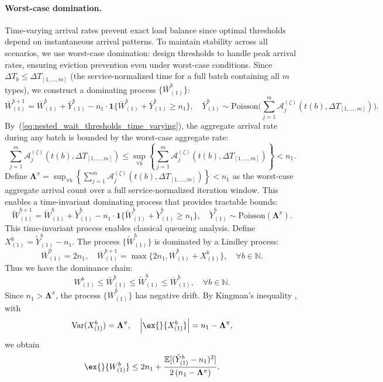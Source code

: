 \paragraph{Worst-case domination.} Time-varying arrival rates prevent exact load balance since optimal thresholds depend on instantaneous arrival patterns. To maintain stability across all scenarios, we use worst-case domination: design thresholds to handle peak arrival rates, ensuring eviction prevention even under worst-case conditions. Since $\Delta T_b\leq \Delta T_{[1,\dots,m]}$ (the service-normalized time for a full batch containing all $m$ types), we construct a dominating process $\{\bar{W}_{(1)}^{b}\}$:
$$ \bar{W}_{(1)}^{b+1} = \bar{W}_{(1)}^{b} + \bar{Y}_{(1)}^b  - n_1 \cdot \mathbf{1}\{ \bar{W}_{(1)}^{b} + \bar{Y}_{(1)}^b \geq n_1 \},  \quad \bar{Y}_{(1)}^b \sim \text{Poisson}\Big(  \sum_{j=1}^m \mathcal A_j^{(\zeta)}(t(b),\Delta T_{[1,\dots,m]}) \Big).  $$
By~(\ref{eq:nested_wait_thresholds_time_varying}), the aggregate arrival rate during any batch is bounded by the worst-case aggregate rate:
$$ \sum_{j=1}^m \mathcal A_j^{(\zeta)}(t(b),\Delta T_{[1,\dots,m]}) \leq \sup_{\forall b}\left\{\sum_{j=1}^m \mathcal A_j^{(\zeta)}(t(b),\Delta T_{[1,\dots,m]}) \right\} < n_1.$$
Define $\mathbf{\Lambda}^{\pi} = \sup_{\forall b}\left\{\sum_{j=1}^m \mathcal A_j^{(\zeta)}(t(b),\Delta T_{[1,\dots,m]}) \right\} < n_1$ as the worst-case aggregate arrival count over a full service-normalized iteration window. This enables a time-invariant dominating process that provides tractable bounds:
$$ \tilde{W}_{(1)}^{b+1} = \tilde{W}_{(1)}^{b} + \tilde{Y}_{(1)}^b  - n_1 \cdot \mathbf{1}\{ \tilde{W}_{(1)}^{b} + \tilde{Y}_{(1)}^b \geq n_1 \},  \quad \tilde{Y}_{(1)}^b \sim \text{Poisson}(\mathbf{\Lambda}^{\pi}).  $$
This time-invariant process enables classical queueing analysis. Define $X_{(1)}^b = \tilde{Y}_{(1)}^b - n_1$. The process $\{ \tilde{W}_{(1)}^{b}\}$ is dominated by a Lindley process:
$$ \overline{W}_{(1)}^{0} = 2n_1,\quad  \overline{W}_{(1)}^{b+1} = \max \{  2n_1, \overline{W}_{(1)}^{b} + X_{(1)}^b \},\quad \forall b \in \mathbb{N}. $$
Thus we have the dominance chain:
$$ W_{(1)}^{b}\leq \bar{W}_{(1)}^{b} \leq \tilde{W}_{(1)}^{b} \leq \overline{W}_{(1)}^{b}, \quad \forall b \in \mathbb{N}.$$
Since $n_1> \mathbf{\Lambda}^{\pi}$, the process $\{\overline{W}_{(1)}^{b} \}$ has negative drift. By Kingman's inequality \citep{kingman1962queues}, with
$$\text{Var}(X_{(1)}^b ) = \mathbf{\Lambda}^{\pi},\quad \left|  \ex{}{X_{(1)}^b} \right| = n_1 - \mathbf{\Lambda}^{\pi},$$
we obtain
$$  \ex{}{W_{(1)}^b}\leq  2n_1 + \frac{\mathbb{E}[(\tilde{Y}_{(1)}^b-n_1)^2]}{2\left(n_1 -\mathbf{\Lambda}^{\pi}\right)}. $$
